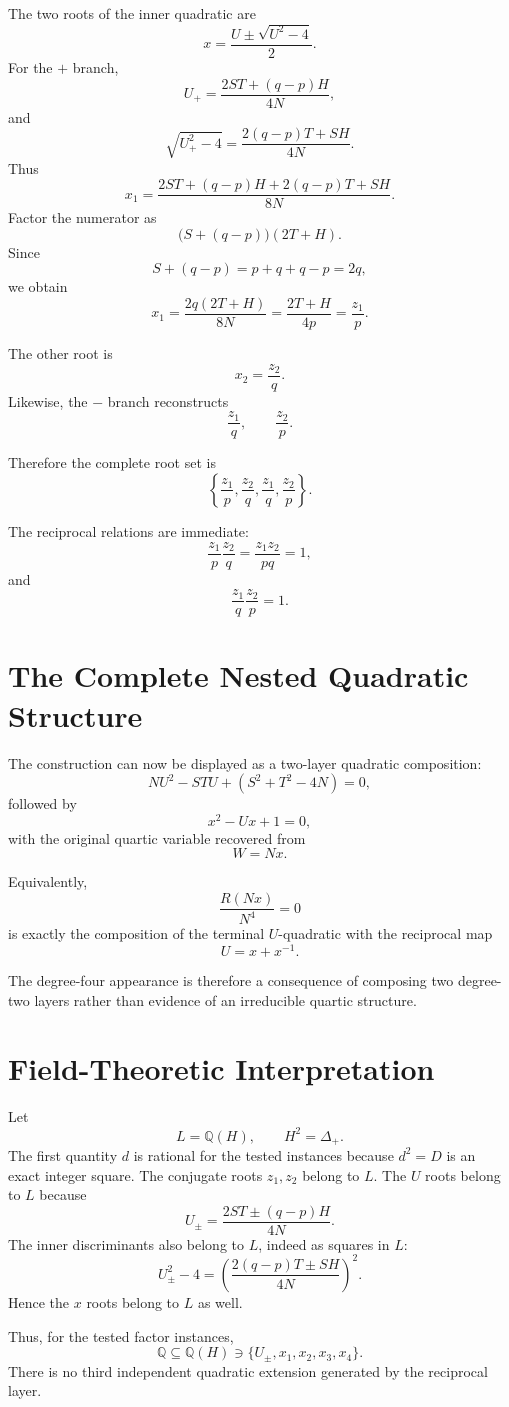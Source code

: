 \documentclass[11pt,a4paper]{article}
\theoremstyle{definition}
\theoremstyle{remark}
\newcommand{\Q}{\mathbb{Q}}
\begin{document}
The two roots of the inner quadratic are
\[
x=\frac{U\pm\sqrt{U^2-4}}{2}.
\]
For the $+$ branch,
\[
U_+=\frac{2ST+(q-p)H}{4N},
\]
and
\[
\sqrt{U_+^2-4}
=\frac{2(q-p)T+SH}{4N}.
\]
Thus
\[
x_1
=\frac{2ST+(q-p)H+2(q-p)T+SH}{8N}.
\]
Factor the numerator as
\[
\bigl(S+(q-p)\bigr)(2T+H).
\]
Since
\[
S+(q-p)=p+q+q-p=2q,
\]
we obtain
\[
 x_1=\frac{2q(2T+H)}{8N}
=\frac{2T+H}{4p}
=\frac{z_1}{p}.
\]

The other root is
\[
 x_2=\frac{z_2}{q}.
\]
Likewise, the $-$ branch reconstructs
\[
\frac{z_1}{q},\qquad \frac{z_2}{p}.
\]

Therefore the complete root set is
\[
\boxed{
\left\{
\frac{z_1}{p},
\frac{z_2}{q},
\frac{z_1}{q},
\frac{z_2}{p}
\right\}.
}
\]

The reciprocal relations are immediate:
\[
\frac{z_1}{p}\frac{z_2}{q}
=\frac{z_1z_2}{pq}=1,
\]
and
\[
\frac{z_1}{q}\frac{z_2}{p}=1.
\]

\section{The Complete Nested Quadratic Structure}

The construction can now be displayed as a two-layer quadratic composition:
\[
\boxed{
NU^2-STU+(S^2+T^2-4N)=0,
}
\]
followed by
\[
\boxed{
x^2-Ux+1=0,
}
\]
with the original quartic variable recovered from
\[
\boxed{W=Nx.}
\]

Equivalently,
\[
\frac{R(Nx)}{N^4}=0
\]
is exactly the composition of the terminal $U$-quadratic with the reciprocal map
\[
U=x+x^{-1}.
\]

The degree-four appearance is therefore a consequence of composing two degree-two layers rather than evidence of an irreducible quartic structure.

\section{Field-Theoretic Interpretation}

Let
\[
L=\Q(H),
\qquad H^2=\Delta_+.
\]
The first quantity $d$ is rational for the tested instances because $d^2=D$ is an exact integer square. The conjugate roots $z_1,z_2$ belong to $L$. The $U$ roots belong to $L$ because
\[
U_\pm=\frac{2ST\pm(q-p)H}{4N}.
\]
The inner discriminants also belong to $L$, indeed as squares in $L$:
\[
U_\pm^2-4
=\left(\frac{2(q-p)T\pm SH}{4N}\right)^2.
\]
Hence the $x$ roots belong to $L$ as well.

Thus, for the tested factor instances,
\[
\boxed{
\Q
\subseteq
\Q(H)
\ni
\{U_\pm,x_1,x_2,x_3,x_4\}.
}
\]
There is no third independent quadratic extension generated by the reciprocal layer.
\end{document}
